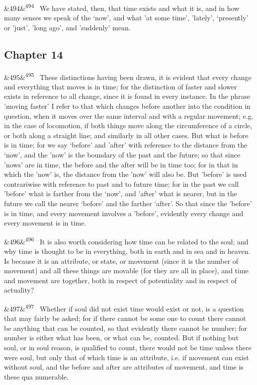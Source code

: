 \documentclass[12pt]{article}
\newcommand{\para}[1][]{\par\noindent\ifx&#1&\else\textsuperscript{\footnotesize #1}~\fi}
\begin{document}
\para[494] We have stated, then, that time exists and what it is, and in how many senses we speak of the ‘now', and what 'at some time’, 'lately', ‘presently’ or 'just', 'long ago', and 'suddenly' mean.

\subsection*{Chapter 14}

\para[495] These distinctions having been drawn, it is evident that every change and everything that moves is in time; for the distinction of faster and slower exists in reference to all change, since it is found in every instance. In the phrase 'moving faster’ I refer to that which changes before another into the condition in question, when it moves over the same interval and with a regular movement; e.g. in the case of locomotion, if both things move along the circumference of a circle, or both along a straight line; and similarly in all other cases. But what is before is in time; for we say ‘before’ and 'after' with reference to the distance from the ‘now’, and the 'now' is the boundary of the past and the future; so that since 'nows' are in time, the before and the after will be in time too; for in that in which the 'now' is, the distance from the 'now' will also be. But 'before' is used contrariwise with reference to past and to future time; for in the past we call 'before' what is farther from the ‘now’, and 'after' what is nearer, but in the future we call the nearer ‘before’ and the farther ‘after’. So that since the 'before' is in time, and every movement involves a 'before', evidently every change and every movement is in time.

\para[496] It is also worth considering how time can be related to the soul; and why time is thought to be in everything, both in earth and in sea and in heaven. Is because it is an attribute, or state, or movement (since it is the number of movement) and all these things are movable (for they are all in place), and time and movement are together, both in respect of potentiality and in respect of actuality?

\para[497] Whether if soul did not exist time would exist or not, is a question that may fairly be asked; for if there cannot be some one to count there cannot be anything that can be counted, so that evidently there cannot be number; for number is either what has been, or what can be, counted. But if nothing but soul, or in soul reason, is qualified to count, there would not be time unless there were soul, but only that of which time is an attribute, i.e. if movement can exist without soul, and the before and after are attributes of movement, and time is these qua numerable.
\end{document}
